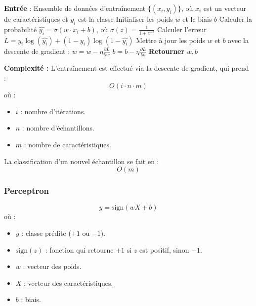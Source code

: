 \begin{algorithm}[H]
\caption{Régression Logistique pour classification}
\begin{algorithmic}[1]
\State \textbf{Entrée} : Ensemble de données d'entraînement $\{(x_i, y_i)\}$, où $x_i$ est un vecteur de caractéristiques et $y_i$ est la classe
\State Initialiser les poids $w$ et le biais $b$
    \State Calculer la probabilité $\hat{y_i} = \sigma(w \cdot x_i + b)$, où $\sigma(z) = \frac{1}{1 + e^{-z}}$
    \State Calculer l'erreur $L = y_i \log(\hat{y_i}) + (1 - y_i) \log(1 - \hat{y_i})$
    \State Mettre à jour les poids $w$ et $b$ avec la descente de gradient :
    \State $w = w - \eta \frac{\partial L}{\partial w}$
    \State $b = b - \eta \frac{\partial L}{\partial b}$
\EndFor
\State \textbf{Retourner} $w, b$
\end{algorithmic}
\end{algorithm}
\textbf{Complexité :}  
L'entraînement est effectué via la descente de gradient, qui prend :
\begin{equation}
O(i \cdot n \cdot m)
\end{equation}
où :
\begin{itemize}
    \item \( i \) : nombre d'itérations.
    \item \( n \) : nombre d'échantillons.
    \item \( m \) : nombre de caractéristiques.
\end{itemize}
La classification d’un nouvel échantillon se fait en :
\begin{equation}
O(m)
\end{equation}

\subsubsection{Perceptron}
\begin{equation}
y = \text{sign}(wX + b)
\end{equation}
où :
\begin{itemize}
    \item \( y \) : classe prédite (\(+1\) ou \(-1\)).
    \item \( \text{sign}(z) \) : fonction qui retourne \( +1 \) si \( z \) est positif, sinon \( -1 \).
    \item \( w \) : vecteur des poids.
    \item \( X \) : vecteur des caractéristiques.
    \item \( b \) : biais.
\end{itemize}

